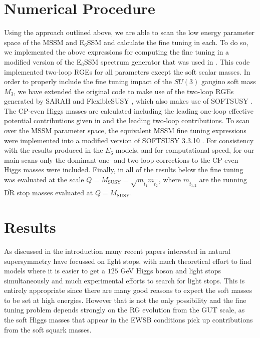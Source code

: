 \documentclass[preprint,amsmath,amssymb,aps,superscriptaddress,prd,showpacs,floatfix,nofootinbib]{revtex4-1}
\begin{document}
\section{\label{sec:numericalprocedure}Numerical Procedure}
Using the approach outlined above, we are able to scan the low energy
parameter space of the MSSM and E$_6$SSM and calculate the fine tuning
in each. To do so, we implemented the above expressions for computing
the fine tuning in a modified version of the E$_6$SSM spectrum
generator that was used in \cite{Athron:2013ipa}. This code
implemented two-loop RGEs for all parameters except the soft scalar
masses. In order to properly include the fine tuning impact of the
$SU(3)$ gaugino soft mass $M_3$, we have extended the original code to
make use of the two-loop RGEs generated by SARAH
\cite{Staub:2009bi,Staub:2010jh,Staub:2012pb,Staub:2013tta} and
FlexibleSUSY \cite{Athron:2014yba}, which also makes use of SOFTSUSY \cite{Allanach:2001kg,Allanach:2013kza}. The CP-even Higgs masses are
calculated including the leading one-loop effective potential
contributions given in \cite{Athron:2009bs} and the leading two-loop
contributions. To scan over the MSSM parameter space, the equivalent
MSSM fine tuning expressions were implemented into a modified version
of SOFTSUSY 3.3.10 \cite{Allanach:2001kg}. For
consistency with the results produced in the $E_6$ models, and for
computational speed, for our main scans only the dominant one- and
two-loop corrections to the CP-even Higgs masses were
included. Finally, in all of the results below the fine tuning was
evaluated at the scale
$Q=M_{\textrm{SUSY}}=\sqrt{m_{\tilde{t}_1}m_{\tilde{t}_2}}$, where
$m_{\tilde{t}_{1,2}}$ are the running $\overline{\textrm{DR}}$ stop
masses evaluated at $Q=M_{\textrm{SUSY}}$.

\section{\label{sec:results}Results}
As discussed in the introduction many recent papers interested in
natural supersymmetry have focussed on light stops, with much
theoretical effort to find models where it is easier to get a $125$
GeV Higgs boson and light stops simultaneously and much experimental
efforts to search for light stops.  This is entirely appropriate since
there are many good reasons to expect the soft masses to be set at
high energies.  However that is not the only possibility and the fine
tuning problem depends strongly on the RG evolution from the GUT
scale, as the soft Higgs masses that appear in the EWSB conditions
pick up contributions from the soft squark masses.
\end{document}
